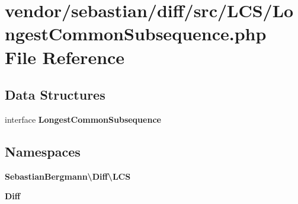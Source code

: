 \section{vendor/sebastian/diff/src/\+L\+C\+S/\+Longest\+Common\+Subsequence.php File Reference}
\label{_longest_common_subsequence_8php}
\subsection*{Data Structures}
\begin{DoxyCompactItemize}
\item 
interface {\bf Longest\+Common\+Subsequence}
\end{DoxyCompactItemize}
\subsection*{Namespaces}
\begin{DoxyCompactItemize}
\item 
 {\bf Sebastian\+Bergmann\textbackslash{}\+Diff\textbackslash{}\+L\+C\+S}
\item 
 {\bf Diff}
\end{DoxyCompactItemize}
